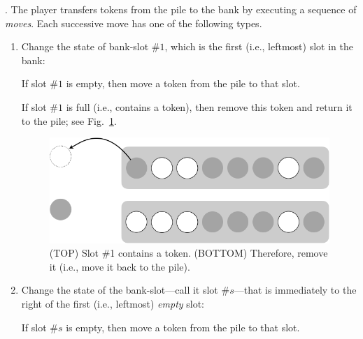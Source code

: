 .
The player transfers tokens from the pile to the bank by executing a
sequence of {\it moves}.  Each successive move has one of the
following types.
\begin{enumerate}
\item
Change the state of bank-slot \#$1$, which is the first (i.e.,
leftmost) slot in the bank:

If slot \#$1$ is empty, then move a token from the pile to that slot.

If slot \#$1$ is full (i.e., contains a token), then remove this token
and return it to the pile; see Fig.~\ref{fig:rule1}.
\begin{figure}[h]
\begin{center}
        \includegraphics[scale=0.3]{FiguresMaths/GameTokenRule1.png}
\caption{(TOP) Slot \#1 contains a token.  (BOTTOM) Therefore, remove
  it (i.e., move it back to the pile).}
        \label{fig:rule1}
\end{center}
\end{figure}

\item
Change the state of the bank-slot---call it slot \#$s$---that is
immediately to the right of the first (i.e., leftmost) {\em empty}
slot:

If slot \#$s$ is empty, then move a token from the pile to that slot.


\end{enumerate}
